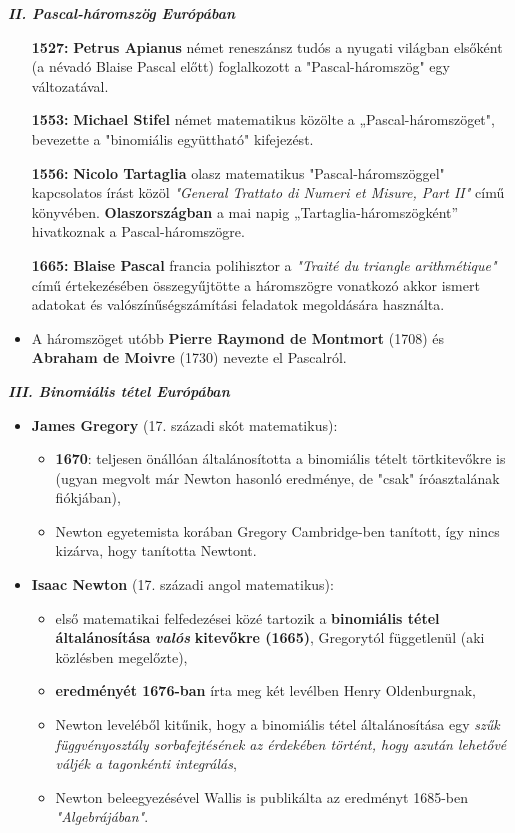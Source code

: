 \textbf{\textit{II. Pascal-háromszög Európában}} 
\begin{itemize}
\item[{\Large\textbf{1527:}}] \textbf{Petrus Apianus} német reneszánsz tudós a \textcolor{ccqqqq}{nyugati
világban elsőként} (a névadó Blaise Pascal előtt) foglalkozott a
"Pascal-háromszög" egy változatával. 
\item[{\Large\textbf{1553:}}] \textbf{Michael Stifel} német matematikus közölte a „Pascal-háromszöget",
\textcolor{ccqqqq}{bevezette a "binomiális együttható"} kifejezést. 
\item[{\Large\textbf{1556:}}] \textbf{Nicolo Tartaglia} olasz matematikus "Pascal-háromszöggel"
kapcsolatos írást közöl \textit{"General Trattato di Numeri et Misure,
Part II"} című könyvében. \textbf{Olaszországban} a mai napig \textcolor{ccqqqq}{„Tartaglia-háromszögként”}
hivatkoznak a Pascal-háromszögre. 
\item[{\Large\textbf{1665:}}] \textbf{Blaise Pascal} francia polihisztor a \textit{"Traité du
triangle arithmétique"} című értekezésében \textcolor{ccqqqq}{összegyűjtötte
a háromszögre vonatkozó akkor ismert adatokat és valószínűségszámítási
feladatok megoldására használta}. 
\item A háromszöget utóbb \textbf{Pierre Raymond de Montmort} (1708) és
\textbf{Abraham de Moivre} (1730) nevezte el Pascalról. 
\end{itemize}
\vspace{0.3cm}

\textbf{\textit{III. Binomiális tétel Európában}}
\begin{itemize}
\item \textbf{James Gregory} (17. századi skót matematikus): 
\begin{itemize}
\item \textbf{1670}: teljesen önállóan \textcolor{ccqqqq}{általánosította
a binomiális tételt törtkitevőkre} is (ugyan megvolt már Newton hasonló
eredménye, de "csak" íróasztalának fiókjában), 
\item Newton egyetemista korában Gregory Cambridge-ben tanított, így nincs
kizárva, hogy tanította Newtont. 
\end{itemize}
\item \textbf{Isaac Newton} (17. századi angol matematikus): 
\begin{itemize}
\item \textcolor{ccqqqq}{első matematikai felfedezései} közé tartozik
a \textcolor{ccqqqq}{\textbf{binomiális tétel általánosítása }\textbf{\textit{valós}}\textbf{
kitevőkre (1665)}}, Gregorytól függetlenül (aki közlésben megelőzte), 
\item \textbf{eredményét 1676-ban} írta meg két levélben Henry Oldenburgnak, 
\item Newton leveléből kitűnik, hogy a binomiális tétel általánosítása egy
\textit{szűk függvényosztály sorbafejtésének az érdekében történt,
hogy azután lehetővé váljék a tagonkénti integrálás}, 
\item Newton beleegyezésével Wallis is publikálta az eredményt 1685-ben
\textit{"Algebrájában"}. 
\end{itemize}
\end{itemize}
\vspace{0.5cm}

